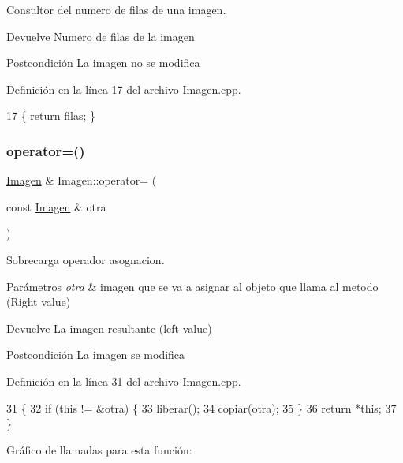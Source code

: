 Consultor del numero de filas de una imagen. 

\begin{DoxyReturn}{Devuelve}
Numero de filas de la imagen 
\end{DoxyReturn}
\begin{DoxyPostcond}{Postcondición}
La imagen no se modifica 
\end{DoxyPostcond}


Definición en la línea 17 del archivo Imagen.\+cpp.


\begin{DoxyCode}
17 \{ \textcolor{keywordflow}{return} filas; \}
\end{DoxyCode}
\mbox{\label{classImagen_aa8bdc0191ef1b952a6405273edf3f3c8}} 
\subsubsection{\texorpdfstring{operator=()}{operator=()}}
{\footnotesize\ttfamily \hyperlink{classImagen}{Imagen} \& Imagen\+::operator= (\begin{DoxyParamCaption}\item[{const \hyperlink{classImagen}{Imagen} \&}]{otra }\end{DoxyParamCaption})}



Sobrecarga operador asognacion. 


\begin{DoxyParams}{Parámetros}
{\em otra} & imagen que se va a asignar al objeto que llama al metodo (Right value) \\
\hline
\end{DoxyParams}
\begin{DoxyReturn}{Devuelve}
La imagen resultante (left value) 
\end{DoxyReturn}
\begin{DoxyPostcond}{Postcondición}
La imagen se modifica 
\end{DoxyPostcond}


Definición en la línea 31 del archivo Imagen.\+cpp.


\begin{DoxyCode}
31                                             \{
32   \textcolor{keywordflow}{if} (\textcolor{keyword}{this} != &otra) \{
33     liberar();
34     copiar(otra);
35   \}
36   \textcolor{keywordflow}{return} *\textcolor{keyword}{this};
37 \}
\end{DoxyCode}
Gráfico de llamadas para esta función\+:
\mbox{\label{classImagen_a7d9378695a7fd2dce8092f180e716229}} 
